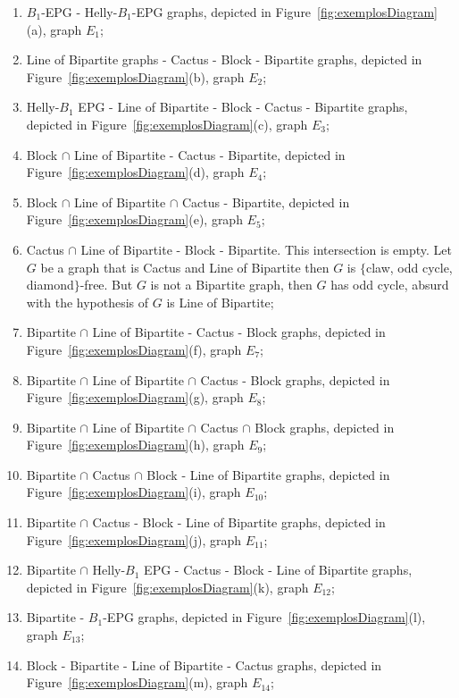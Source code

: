 \documentclass[9pt]{entcs}
\begin{document}
\begin{enumerate}[label=(\arabic*)]
    \item $B_1$-EPG  - Helly-$B_1$-EPG graphs, depicted in Figure~\ref{fig:exemplosDiagram}(a), graph $E_1$;%
    
    \item Line of Bipartite graphs  - Cactus - Block - Bipartite graphs, depicted in Figure~\ref{fig:exemplosDiagram}(b), graph $E_2$;%
    \item Helly-$B_1$ EPG - Line of Bipartite - Block - Cactus - Bipartite graphs, depicted in Figure~\ref{fig:exemplosDiagram}(c), graph $E_3$;%
    \item Block $\cap$ Line of Bipartite - Cactus - Bipartite, depicted in Figure~\ref{fig:exemplosDiagram}(d), graph $E_4$;%
    \item Block $\cap$ Line of Bipartite $\cap$  Cactus - Bipartite, depicted in Figure~\ref{fig:exemplosDiagram}(e), graph $E_5$;%
    \item Cactus $\cap$ Line of Bipartite - Block - Bipartite. This intersection is empty. Let $G$ be a graph that is Cactus and Line of Bipartite then $G$ is $\{$claw, odd cycle, diamond$\}$-free. But $G$ is not a Bipartite graph, then $G$ has odd cycle, %
     absurd with the hypothesis of $G$ is Line of Bipartite;%
    \item Bipartite $\cap$ Line of Bipartite  - Cactus - Block graphs, depicted in Figure~\ref{fig:exemplosDiagram}(f), graph $E_7$;%
    \item Bipartite $\cap$ Line of Bipartite $\cap$  Cactus - Block graphs, depicted in Figure~\ref{fig:exemplosDiagram}(g), graph $E_8$;%
    \item Bipartite $\cap$ Line of Bipartite $\cap$  Cactus $\cap$ Block graphs, depicted in Figure~\ref{fig:exemplosDiagram}(h), graph $E_9$;%
  \item Bipartite $\cap$  Cactus $\cap$ Block - Line of Bipartite graphs, depicted in Figure~\ref{fig:exemplosDiagram}(i), graph $E_{10}$;%
    \item Bipartite  $\cap$  Cactus - Block -  Line of Bipartite graphs, depicted in Figure~\ref{fig:exemplosDiagram}(j), graph $E_{11}$;%
     \item Bipartite $\cap$ Helly-$B_1$ EPG - Cactus - Block -  Line of Bipartite graphs, depicted in Figure~\ref{fig:exemplosDiagram}(k), graph $E_{12}$;%
      \item Bipartite - $B_1$-EPG graphs, depicted in Figure~\ref{fig:exemplosDiagram}(l), graph $E_{13}$;%
      \item Block - Bipartite - Line of Bipartite  - Cactus graphs, depicted in Figure~\ref{fig:exemplosDiagram}(m), graph $E_{14}$;%
 

\end{enumerate}
\end{document}
